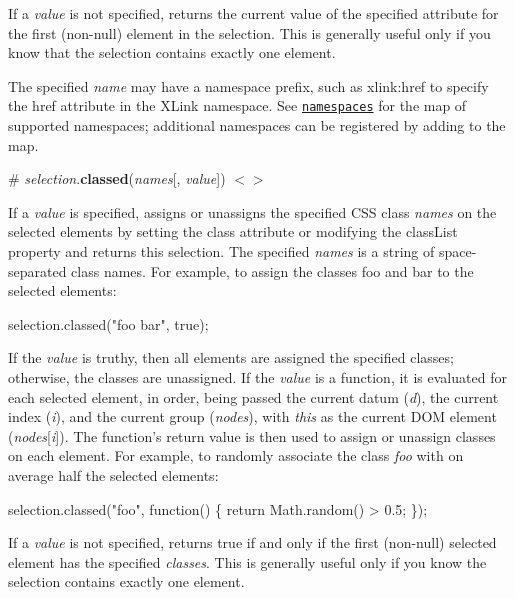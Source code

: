 If a {\itshape value} is not specified, returns the current value of the specified attribute for the first (non-\/null) element in the selection. This is generally useful only if you know that the selection contains exactly one element.

The specified {\itshape name} may have a namespace prefix, such as {\ttfamily xlink\+:href} to specify the {\ttfamily href} attribute in the X\+Link namespace. See \href{#namespaces}{\tt namespaces} for the map of supported namespaces; additional namespaces can be registered by adding to the map.

\label{_selection_classed}%
\# {\itshape selection}.{\bfseries classed}({\itshape names}\mbox{[}, {\itshape value}\mbox{]}) \href{https://github.com/d3/d3-selection/blob/master/src/selection/classed.js}{\tt $<$$>$}

If a {\itshape value} is specified, assigns or unassigns the specified C\+SS class {\itshape names} on the selected elements by setting the {\ttfamily class} attribute or modifying the {\ttfamily class\+List} property and returns this selection. The specified {\itshape names} is a string of space-\/separated class names. For example, to assign the classes {\ttfamily foo} and {\ttfamily bar} to the selected elements\+:


\begin{DoxyCode}
selection.classed("foo bar", true);
\end{DoxyCode}


If the {\itshape value} is truthy, then all elements are assigned the specified classes; otherwise, the classes are unassigned. If the {\itshape value} is a function, it is evaluated for each selected element, in order, being passed the current datum ({\itshape d}), the current index ({\itshape i}), and the current group ({\itshape nodes}), with {\itshape this} as the current D\+OM element ({\itshape nodes}\mbox{[}{\itshape i}\mbox{]}). The function’s return value is then used to assign or unassign classes on each element. For example, to randomly associate the class {\itshape foo} with on average half the selected elements\+:


\begin{DoxyCode}
selection.classed("foo", function() \{ return Math.random() > 0.5; \});
\end{DoxyCode}


If a {\itshape value} is not specified, returns true if and only if the first (non-\/null) selected element has the specified {\itshape classes}. This is generally useful only if you know the selection contains exactly one element.

